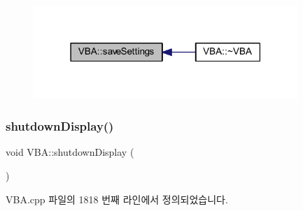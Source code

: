 \nopagebreak
\begin{figure}[H]
\begin{center}
\leavevmode
\includegraphics[width=283pt]{class_v_b_a_aa09989acc3edb3991dc98a88655dabdb_icgraph}
\end{center}
\end{figure}
\mbox{\label{class_v_b_a_ac71d70eba3bf4229255b6aeeea9573e5}} 
\subsubsection{\texorpdfstring{shutdown\+Display()}{shutdownDisplay()}}
{\footnotesize\ttfamily void V\+B\+A\+::shutdown\+Display (\begin{DoxyParamCaption}{ }\end{DoxyParamCaption})}



V\+B\+A.\+cpp 파일의 1818 번째 라인에서 정의되었습니다.


